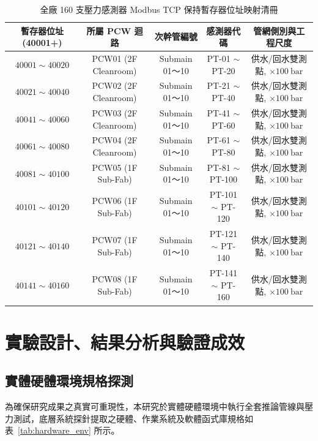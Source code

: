 \documentclass[fontset=none, a4paper, 12pt]{ctexart}
\begin{document}
\begin{doublespace}
\begin{table}[H]
\centering
\caption{全廠 160 支壓力感測器 Modbus TCP 保持暫存器位址映射清冊}
\label{tab:modbus_mapping}
\footnotesize
\renewcommand{\arraystretch}{1.15}
\setlength{\tabcolsep}{5pt}
\begin{tabularx}{0.96\textwidth}{ccccc}
\toprule
\textbf{暫存器位址 (40001+)} & \textbf{所屬 PCW 迴路} & \textbf{次幹管編號} & \textbf{感測器代碼} & \textbf{管網側別與工程尺度} \\
\midrule
$40001 \sim 40020$ & PCW01 (2F Cleanroom) & Submain 01～10 & PT-01 $\sim$ PT-20 & 供水/回水雙測點, $\times 100\ \mathrm{bar}$ \\
$40021 \sim 40040$ & PCW02 (2F Cleanroom) & Submain 01～10 & PT-21 $\sim$ PT-40 & 供水/回水雙測點, $\times 100\ \mathrm{bar}$ \\
$40041 \sim 40060$ & PCW03 (2F Cleanroom) & Submain 01～10 & PT-41 $\sim$ PT-60 & 供水/回水雙測點, $\times 100\ \mathrm{bar}$ \\
$40061 \sim 40080$ & PCW04 (2F Cleanroom) & Submain 01～10 & PT-61 $\sim$ PT-80 & 供水/回水雙測點, $\times 100\ \mathrm{bar}$ \\
$40081 \sim 40100$ & PCW05 (1F Sub-Fab)   & Submain 01～10 & PT-81 $\sim$ PT-100 & 供水/回水雙測點, $\times 100\ \mathrm{bar}$ \\
$40101 \sim 40120$ & PCW06 (1F Sub-Fab)   & Submain 01～10 & PT-101 $\sim$ PT-120 & 供水/回水雙測點, $\times 100\ \mathrm{bar}$ \\
$40121 \sim 40140$ & PCW07 (1F Sub-Fab)   & Submain 01～10 & PT-121 $\sim$ PT-140 & 供水/回水雙測點, $\times 100\ \mathrm{bar}$ \\
$40141 \sim 40160$ & PCW08 (1F Sub-Fab)   & Submain 01～10 & PT-141 $\sim$ PT-160 & 供水/回水雙測點, $\times 100\ \mathrm{bar}$ \\
\bottomrule
\end{tabularx}
\end{table}

\clearpage
\section{實驗設計、結果分析與驗證成效}

\subsection{實體硬體環境規格探測}
為確保研究成果之真實可重現性，本研究於實體硬體環境中執行全套推論管線與壓力測試，底層系統探針提取之硬體、作業系統及軟體函式庫規格如表~\ref{tab:hardware_env} 所示。


\end{doublespace}
\end{document}
